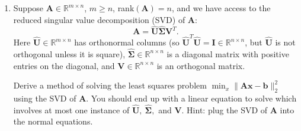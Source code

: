 \documentclass[]{article}
\newcommand{\R}{\mathbb{R}}				%
\newcommand{\x}{\bm{x}}					%
\newcommand{\A}{\bm{A}}					%
\newcommand{\vrange}{\mathrm{range}}		%
\newcommand{\solution}{\vskip 0.5cm \textbf{\large Solution:} \\}
\begin{document}
\begin{enumerate}
	  \solution
	  \begin{enumerate}
	  \item Since $\bm{w}\in N(\A)$, we can see that $$\|\A(\x +
        \bm{w})-\bm{b}\|^2_2 = \|(\A\x + \A\bm{w})-\bm{b}\|^2_2 =
        \|\A\x-\bm{b}\|^2_2$$ and so the norms of the residuals for
        $\hat \x + \bm{w}$ and $\x$ are equivalent.

	  \item Since a least-squares solution is the unique point in
        $\vrange(\A)$ that minimizes $\|\bm{r}\|^2_2$, if $\bm{u}$ and
        $\bm{v}$ minimize $\|\A\x-\bm{b}\|^2_2$, we must have
        \begin{gather*}
          \A\bm{u} - \bm{b} = \bm{r} \\
          \A\bm{v} - \bm{b} = \bm{r}
        \end{gather*}
        By subtracting these we find
        \[\begin{split}
        \A\bm{u} - \A\bm{v} &= \bm{0} \\
        \A(\bm{u} - \bm{v}) &= \bm{0}
        \end{split}\]
        Or in otherwords, $\bm{u} - \bm{v} \in N(\A)$.

	  \item In this special case, we can use the normal equations to derive a solution xfor x:
        \[\begin{split}
        \A^T\A\hat \x &= \A^T\bm{b} \\
        \bm{I}\hat \x &= \A^T\bm{b} \\
        \hat \x &= \A^T\bm{b}
        \end{split}\]
	  \end{enumerate}

	\item Suppose $\A\in\R^{m\times n}$, $m\geq n$, rank$(\A)=n$, and we have access to the reduced singular value decomposition (SVD) of $\A$:
	  \[
	  \A = \bm{\hat U \hat \Sigma} \bm{V}^T.
	  \]
	  Here $\bm{\hat U}\in\R^{m\times n}$ has orthonormal columns (so $\bm{\hat U}^T\bm{\hat U}=\bm{I}\in\R^{n\times n}$, but $\bm{\hat U}$ is not orthogonal unless it is square), $\bm{\hat \Sigma}\in\R^{n\times n}$ is a diagonal matrix with positive entries on the diagonal, and $\bm{V}\in\R^{n\times n}$ is an orthogonal matrix.

	  Derive a method of solving the least squares problem $\min_x\|\A\x-\bm{b}\|_2^2$ using the SVD of $\A$. You should end up with a linear equation to solve which involves at most one instance of $\bm{\hat U},~\bm{\hat\Sigma},$ and $\bm{V}$. Hint: plug the SVD of $\A$ into the normal equations.


\end{enumerate}
\end{document}
